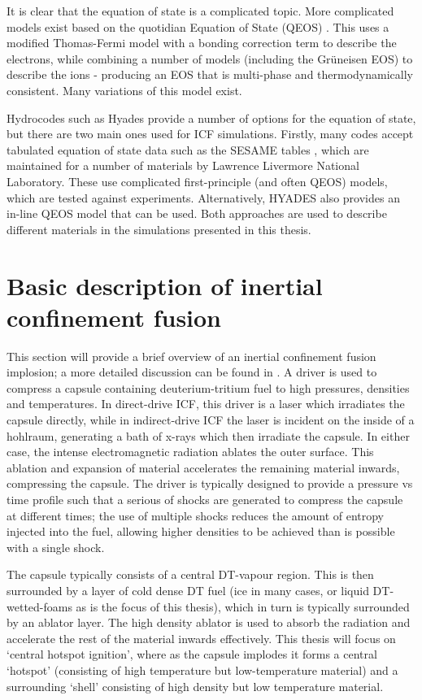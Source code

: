 It is clear that the equation of state is a complicated topic. More complicated models exist based on the quotidian Equation of State (QEOS) \cite{More1988}. This uses a modified Thomas-Fermi model with a bonding correction term to describe the electrons, while combining a number of models (including the Gr{\"u}neisen EOS) to describe the ions - producing an EOS that is multi-phase and thermodynamically consistent. Many variations of this model exist. 

Hydrocodes such as Hyades provide a number of options for the equation of state, but there are two main ones used for ICF simulations. Firstly, many codes accept tabulated equation of state data such as the SESAME tables \cite{SESAMEgeneric}, which are maintained for a number of materials by Lawrence Livermore National Laboratory. These use complicated first-principle (and often QEOS) models, which are tested against experiments. Alternatively, HYADES also provides an in-line QEOS model that can be used. Both approaches are used to describe different materials in the simulations presented in this thesis.

\section{Basic description of inertial confinement fusion}

This section will provide a brief overview of an inertial confinement fusion implosion; a more detailed discussion can be found in \cite{Atzeni2008}. A driver is used to compress a capsule containing deuterium-tritium fuel to high pressures, densities and temperatures. In direct-drive ICF, this driver is a laser which irradiates the capsule directly, while in indirect-drive ICF the laser is incident on the inside of a hohlraum, generating a bath of x-rays which then irradiate the capsule. In either case, the intense electromagnetic radiation ablates the outer surface. This ablation and expansion of material accelerates the remaining material inwards, compressing the capsule. The driver is typically designed to provide a pressure vs time profile such that a serious of shocks are generated to compress the capsule at different times; the use of multiple shocks reduces the amount of entropy injected into the fuel, allowing higher densities to be achieved than is possible with a single shock.

The capsule typically consists of a central DT-vapour region. This is then surrounded by a layer of cold dense DT fuel (ice in many cases, or liquid DT-wetted-foams as is the focus of this thesis), which in turn is typically surrounded by an ablator layer. The high density ablator is used to absorb the radiation and accelerate the rest of the material inwards effectively. This thesis will focus on `central hotspot ignition', where as the capsule implodes it forms a central `hotspot' (consisting of high temperature but low-temperature material) and a surrounding `shell' consisting of high density but low temperature material.

